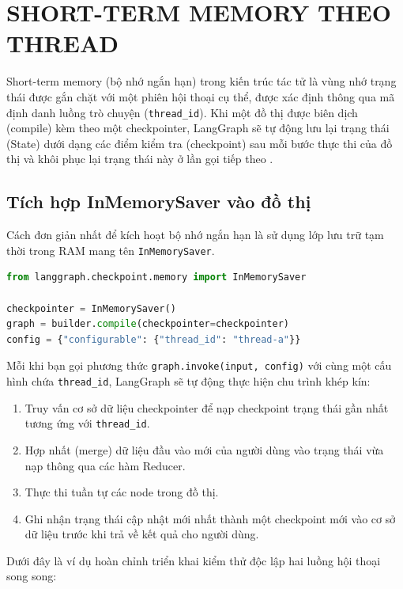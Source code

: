 \chapter{SHORT-TERM MEMORY THEO THREAD}
\label{chap:short-term}

Short-term memory (bộ nhớ ngắn hạn) trong kiến trúc tác tử là vùng nhớ trạng thái được gắn chặt với một phiên hội thoại cụ thể, được xác định thông qua mã định danh luồng trò chuyện (\texttt{thread\_id}). Khi một đồ thị được biên dịch (compile) kèm theo một checkpointer, LangGraph sẽ tự động lưu lại trạng thái (State) dưới dạng các điểm kiểm tra (checkpoint) sau mỗi bước thực thi của đồ thị và khôi phục lại trạng thái này ở lần gọi tiếp theo \parencite{langgraphPersistence}.

\section{Tích hợp InMemorySaver vào đồ thị}

Cách đơn giản nhất để kích hoạt bộ nhớ ngắn hạn là sử dụng lớp lưu trữ tạm thời trong RAM mang tên \texttt{InMemorySaver}.

\begin{lstlisting}[language=Python,caption={Ba dòng tạo short-term memory}]
from langgraph.checkpoint.memory import InMemorySaver

checkpointer = InMemorySaver()
graph = builder.compile(checkpointer=checkpointer)
config = {"configurable": {"thread_id": "thread-a"}}
\end{lstlisting}

Mỗi khi bạn gọi phương thức \texttt{graph.invoke(input, config)} với cùng một cấu hình chứa \texttt{thread\_id}, LangGraph sẽ tự động thực hiện chu trình khép kín:
\begin{enumerate}
  \item Truy vấn cơ sở dữ liệu checkpointer để nạp checkpoint trạng thái gần nhất tương ứng với \texttt{thread\_id}.
  \item Hợp nhất (merge) dữ liệu đầu vào mới của người dùng vào trạng thái vừa nạp thông qua các hàm Reducer.
  \item Thực thi tuần tự các node trong đồ thị.
  \item Ghi nhận trạng thái cập nhật mới nhất thành một checkpoint mới vào cơ sở dữ liệu trước khi trả về kết quả cho người dùng.
\end{enumerate}

Dưới đây là ví dụ hoàn chỉnh triển khai kiểm thử độc lập hai luồng hội thoại song song:

